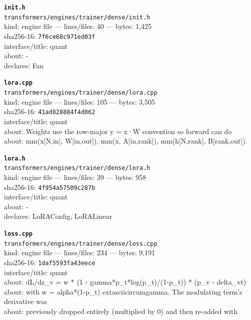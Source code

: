 \noindent\textbf{\texttt{init.h}}\\
\texttt{transformers/engines/trainer/dense/init.h}\\
kind: engine file --- lines/files: 40 --- bytes: 1,425\\
sha256-16: \texttt{7f6ce68c971ed03f}\\
interface/title: quant\\
about: -\\
declares: Fan\\
\vspace*{6.0pt}
\newpage

\noindent\textbf{\texttt{lora.cpp}}\\
\texttt{transformers/engines/trainer/dense/lora.cpp}\\
kind: engine file --- lines/files: 105 --- bytes: 3,505\\
sha256-16: \texttt{41ad828884f4d062}\\
interface/title: quant\\
about: Weights use the row-major y = x·W convention so forward can do\\
about: mm(x[N,in], W[in,out]), mm(x, A[in,rank]), mm(h[N,rank], B[rank,out]).\\
\vspace*{6.0pt}

\noindent\textbf{\texttt{lora.h}}\\
\texttt{transformers/engines/trainer/dense/lora.h}\\
kind: engine file --- lines/files: 39 --- bytes: 958\\
sha256-16: \texttt{4f954a57509c287b}\\
interface/title: quant\\
about: -\\
declares: LoRAConfig, LoRALinear\\
\vspace*{6.0pt}

\noindent\textbf{\texttt{loss.cpp}}\\
\texttt{transformers/engines/trainer/dense/loss.cpp}\\
kind: engine file --- lines/files: 234 --- bytes: 9,191\\
sha256-16: \texttt{1daf5593fa43eece}\\
interface/title: quant\\
about: dL/dz\_v = w * (1 - gamma*p\_t*log(p\_t)/(1-p\_t)) * (p\_v - delta\_vt)\\
about: with w = alpha*(1-p\_t)	extasciicircum{}gamma. The modulating term's derivative was\\
about: previously dropped entirely (multiplied by 0) and then re-added with\\
\vspace*{6.0pt}

